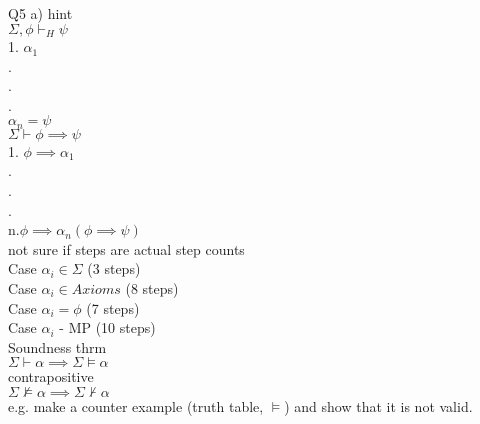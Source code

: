 \documentclass[12pt,oneside,fleqn]{article}
\theoremstyle{definition}
\begin{document}
Q5 a) hint \\
$\Sigma , \phi \vdash_H \psi$ \\
1. $\alpha_1$ \\
 . \\
 . \\
 . \\
$ \alpha_n = \psi$ \\
$ \Sigma \vdash \phi \implies \psi$ \\
 1. $\phi \implies \alpha_1$ \\
  . \\
  . \\
  . \\
 n.$ \phi \implies \alpha_n (\phi \implies \psi)$ \\
 not sure if steps are actual step counts \\
 Case $\alpha_i \in \Sigma$ (3 steps) \\
 Case $\alpha_i \in Axioms$ (8 steps) \\
 Case $\alpha_i = \phi$ (7 steps) \\
 Case $\alpha_i$ - MP (10 steps) \\
Soundness thrm \\

$\Sigma \vdash \alpha \implies \Sigma \vDash \alpha $\\
contrapositive  \\
$\Sigma \not \vDash \alpha \implies \Sigma \not \vdash \alpha$ \\
e.g. make a counter example (truth table, $\vDash$) and show that it is not valid. \\
\end{document}
